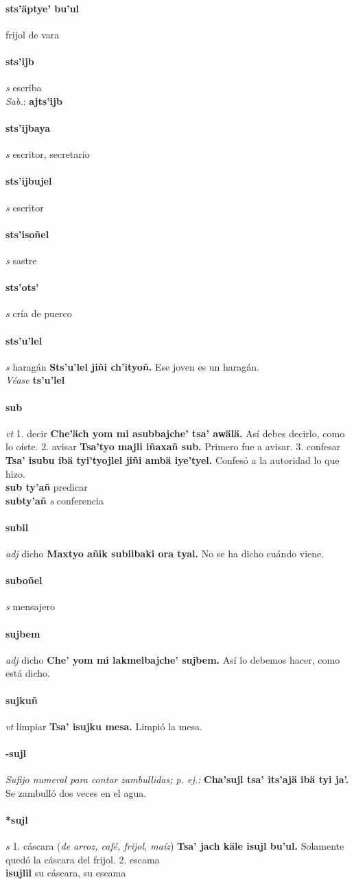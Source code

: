 \documentclass{scrbook}
\newcommand{\entry}[1]{\paragraph{#1}}
\newcommand{\onedefinition}[1]{#1.}
\newcommand{\nontranslationdef}[1]{\textit{#1}}
\newcommand{\partofspeech}[1]{\textit{#1}}
\newcommand{\spanishtranslation}[1]{#1}
\newcommand{\clarification}[1]{(\textit{#1})}
\newcommand{\cholexample}[1]{\textbf{#1}}
\newcommand{\exampletranslation}[1]{#1}
\newcommand{\dialectvariant}[1]{\\\textit{#1}:}
\newcommand{\dialectword}[1]{\textbf{#1}}
\newcommand{\alsosee}[1]{\\\textit{Véase} \textbf{#1}}
\newcommand{\secondaryentry}[1]{\\\textbf{#1}}
\newcommand{\secondpartofspeech}[1]{\textit{#1}}
\newcommand{\secondtranslation}[1]{#1}
\begin{document}
\begin{multicols}{2}
\entry{sts'äptye' bu'ul}
\spanishtranslation{frijol de vara}

\entry{sts'ijb}
\partofspeech{s}
\spanishtranslation{escriba}
\dialectvariant{Sab.}
\dialectword{ajts'ijb}

\entry{sts'ijbaya}
\partofspeech{s}
\spanishtranslation{escritor, secretario}

\entry{sts'ijbujel}
\partofspeech{s}
\spanishtranslation{escritor}

\entry{sts'isoñel}
\partofspeech{s}
\spanishtranslation{sastre}

\entry{sts'ots'}
\partofspeech{s}
\spanishtranslation{cría de puerco}

\entry{sts'u'lel}
\partofspeech{s}
\spanishtranslation{haragán}
\cholexample{Sts'u'lel jiñi ch'ityoñ.}
\exampletranslation{Ese joven es un haragán.}
\alsosee{ts'u'lel}

\entry{sub}
\partofspeech{vt}
\onedefinition{1}
\spanishtranslation{decir}
\cholexample{Che'äch yom mi asubbajche' tsa' awälä.}
\exampletranslation{Así debes decirlo, como lo oíste.}
\onedefinition{2}
\spanishtranslation{avisar}
\cholexample{Tsa'tyo majli iñaxañ sub.}
\exampletranslation{Primero fue a avisar.}
\onedefinition{3}
\spanishtranslation{confesar}
\cholexample{Tsa' isubu ibä tyi'tyojlel jiñi ambä iye'tyel.}
\exampletranslation{Confesó a la autoridad lo que hizo.}
\secondaryentry{sub ty'añ}
\secondtranslation{predicar}
\secondaryentry{subty'añ}
\secondpartofspeech{s}
\secondtranslation{conferencia}

\entry{subil}
\partofspeech{adj}
\spanishtranslation{dicho}
\cholexample{Maxtyo añik subilbaki ora tyal.}
\exampletranslation{No se ha dicho cuándo viene.}

\entry{suboñel}
\partofspeech{s}
\spanishtranslation{mensajero}

\entry{sujbem}
\partofspeech{adj}
\spanishtranslation{dicho}
\cholexample{Che' yom mi lakmelbajche' sujbem.}
\exampletranslation{Así lo debemos hacer, como está dicho.}

\entry{sujkuñ}
\partofspeech{vt}
\spanishtranslation{limpiar}
\cholexample{Tsa' isujku mesa.}
\exampletranslation{Limpió la mesa.}

\entry{-sujl}
\nontranslationdef{Sufijo numeral para contar zambullidas; p. ej.:}
\cholexample{Cha'sujl tsa' its'ajä ibä tyi ja'.}
\exampletranslation{Se zambulló dos veces en el agua.}

\entry{*sujl}
\partofspeech{s}
\onedefinition{1}
\spanishtranslation{cáscara}
\clarification{de arroz, café, frijol, maíz}
\cholexample{Tsa' jach käle isujl bu'ul.}
\exampletranslation{Solamente quedó la cáscara del frijol.}
\onedefinition{2}
\spanishtranslation{escama}
\secondaryentry{isujlil}
\secondtranslation{su cáscara, su escama}


\end{multicols}
\end{document}
